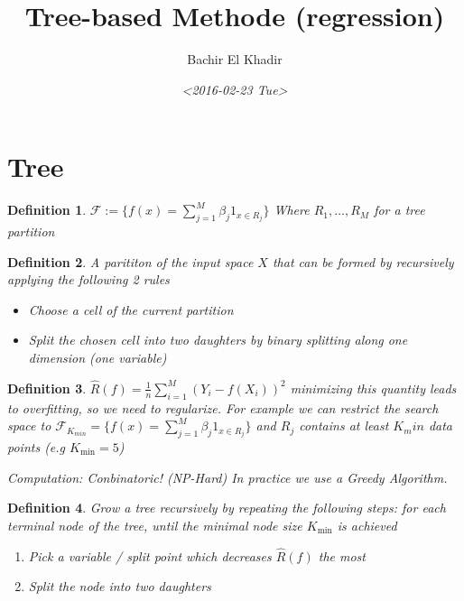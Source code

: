 \documentclass[11pt]{article}
\author{Bachir El Khadir}
\date{\textit{<2016-02-23 Tue>}}
\title{Tree-based Methode (regression)}
\newtheorem{definition}{Definition}
\begin{document}
\maketitle
\tableofcontents




\section{Tree}
\label{sec:orgheadline3}

\begin{definition}
\(\mathcal{F} := \{ f(x) = \sum_{j=1}^M \beta_j 1_{x \in R_j} \}\)  Where \(R_1, \ldots, R_M\) for a \emph{tree partition}
\label{orgspecialblock1}

\end{definition}

\begin{definition}
A parititon of the input space \(X\) that can be formed by recursively applying the following 2 rules
\begin{itemize}
\item Choose a cell of the current partition
\item Split the chosen cell into two daughters by binary splitting along one dimension (one variable)
\end{itemize}
\label{orgspecialblock2}

\end{definition}

\begin{definition}
\(\hat R(f) = \frac1n \sum_{i=1}^M (Y_i - f(X_i))^2\)
minimizing this quantity leads to overfitting, so we need to regularize.
For example we can restrict the search space to \(\mathcal{F}_{K_{min}} =\{f(x) = \sum_{j=1}^M \beta_j 1_{x \in R_j} \}\) and \(R_j\) contains at least \(K_min\) data points (e.g \(K_{\min} = 5\))

Computation: Conbinatoric! (NP-Hard)
In practice we use a Greedy Algorithm.
\label{orgspecialblock3}

\end{definition}

\begin{definition}
Grow a tree recursively by repeating the following steps:
for each terminal node of the tree, until the minimal node size \(K_{\min}\) is achieved
\begin{enumerate}
\item Pick a variable / split point which decreases \(\hat R(f)\) the most
\item Split the node into two daughters
\end{enumerate}
\label{orgspecialblock4}

\end{definition}
\end{document}
